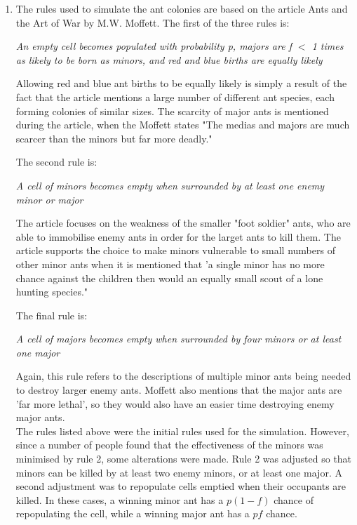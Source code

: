 \begin{enumerate}

\item The rules used to simulate the ant colonies are based on the article Ants 
and the Art of War by M.W. Moffett.  The first of the three rules is:

\begin{myquote}
\textit{An empty cell becomes populated with probability p, majors are 
f $<$ 1 times as likely to be born as minors, and red and blue births are equally 
likely}
\end{myquote}

Allowing red and blue ant births to be equally likely is simply a result of the 
fact that the article mentions a large number of different ant species, each 
forming colonies of similar sizes.  The scarcity of major ants is mentioned 
during the article, when the Moffett states "The medias and majors are much 
scarcer than the minors but far more deadly."

The second rule is:

\begin{myquote}
\textit{A cell of minors becomes empty when surrounded by at least one 
enemy minor or major}
\end{myquote}

The article focuses on the weakness of the smaller "foot soldier" ants, who are 
able to immobilise enemy ants in order for the larget ants to kill them.  The 
article supports the choice to make minors vulnerable to small numbers of other 
minor ants when it is mentioned that 'a single minor has no more chance against 
the children then would an equally small scout of a lone hunting species."

The final rule is:

\begin{myquote}
\textit{A cell of majors becomes empty when surrounded by four minors 
or at least one major}
\end{myquote}

Again, this rule refers to the descriptions of multiple minor ants being needed 
to destroy larger enemy ants.  Moffett also mentions that the major ants are 
'far more lethal', so they would also have an easier time destroying enemy 
major ants. \\

The rules listed above were the initial rules used for the simulation.  
However, since a number of people found that the effectiveness of the minors 
was minimised by rule 2, some alterations were made.  Rule 2 was adjusted so 
that minors can be killed by at least two enemy minors, or at least one major.  
A second adjustment was to repopulate cells emptied when their occupants are 
killed.  In these cases, a winning minor ant has a $p(1-f)$ chance of
repopulating the cell, while a winning major ant has a $pf$ chance.


\end{enumerate}
